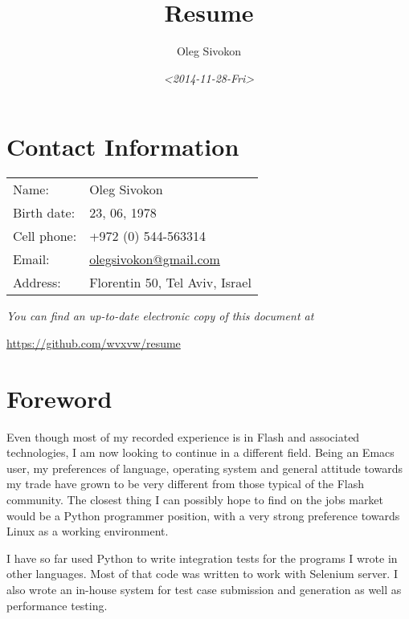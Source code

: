 \documentclass[11pt]{article}
\author{Oleg Sivokon}
\date{\textit{<2014-11-28-Fri>}}
\title{Resume}
\begin{document}
\maketitle

\clearpage
\thispagestyle{plain}
\clearpage

\section{Contact Information}
\label{sec-1}
\begin{center}
\begin{tabular}{ll}
Name: & Oleg Sivokon\\
Birth date: & 23, 06, 1978\\
Cell phone: & +972 (0) 544-563314\\
Email: & \href{mailto:olegsivokon@gmail.com}{olegsivokon@gmail.com}\\
Address: & Florentin 50, Tel Aviv, Israel\\
\end{tabular}
\end{center}

\emph{You can find an up-to-date electronic copy of this document at}

\url{https://github.com/wvxvw/resume}

\clearpage
\section{Foreword}
\label{sec-2}
Even though most of my recorded experience is in Flash and associated
technologies, I am now looking to continue in a different field.  Being an
Emacs user, my preferences of language, operating system and general attitude
towards my trade have grown to be very different from those typical of the
Flash community.  The closest thing I can possibly hope to find on the jobs
market would be a Python programmer position, with a very strong preference
towards Linux as a working environment.

I have so far used Python to write integration tests for the programs I
wrote in other languages.  Most of that code was written to work with Selenium
server.  I also wrote an in-house system for test case submission and generation
as well as performance testing.
\end{document}
